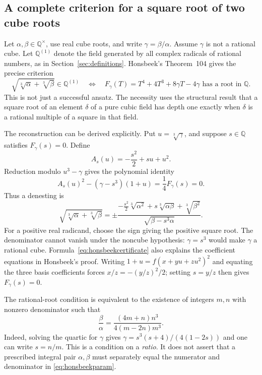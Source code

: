 \documentclass[11pt,a4paper]{article}
\newcommand{\Q}{\mathbb{Q}}
\newcommand{\cbrt}[1]{\sqrt[3]{#1}}
\theoremstyle{definition}
\theoremstyle{remark}
\numberwithin{equation}{section}
\begin{document}
\subsection{A complete criterion for a square root of two cube roots}

Let $\alpha,\beta\in\Q^\times$, use real cube roots, and write $\gamma=\beta/\alpha$. Assume $\gamma$ is not a rational cube. Let $\Q^{(1)}$ denote the field generated by all complex radicals of rational numbers, as in Section~\ref{sec:definitions}. Honsbeek's Theorem~104 gives the precise criterion
\begin{equation}\label{eq:honsbeektest}
 \sqrt{\cbrt\alpha+\cbrt\beta}\in\Q^{(1)}
 \quad\Longleftrightarrow\quad
 F_\gamma(T)=T^4+4T^3+8\gamma T-4\gamma
 \text{ has a root in }\Q.
\end{equation}
This is not just a successful ansatz. The necessity uses the structural result that a square root of an element $\delta$ of a pure cubic field has depth one exactly when $\delta$ is a rational multiple of a square in that field.\cite{honsbeek2005}

The reconstruction can be derived explicitly. Put $u=\cbrt\gamma$, and suppose $s\in\Q$ satisfies $F_\gamma(s)=0$. Define
\[
 A_s(u)=-\frac{s^2}{2}+su+u^2.
\]
Reduction modulo $u^3-\gamma$ gives the polynomial identity
\begin{equation}\label{eq:honsbeekcertificate}
 A_s(u)^2-(\gamma-s^3)(1+u)=\frac14F_\gamma(s)=0.
\end{equation}
Thus a denesting is
\begin{equation}\label{eq:honsbeekreconstruction}
 \sqrt{\cbrt\alpha+\cbrt\beta}
 =\pm\frac{-\frac{s^2}{2}\cbrt{\alpha^2}
                 +s\cbrt{\alpha\beta}+\cbrt{\beta^2}}
                {\sqrt{\beta-s^3\alpha}}.
\end{equation}
For a positive real radicand, choose the sign giving the positive square root. The denominator cannot vanish under the noncube hypothesis: $\gamma=s^3$ would make $\gamma$ a rational cube. Formula~\eqref{eq:honsbeekcertificate} also explains the coefficient equations in Honsbeek's proof. Writing $1+u=f(x+yu+zu^2)^2$ and equating the three basis coefficients forces $x/z=-(y/z)^2/2$; setting $s=y/z$ then gives $F_\gamma(s)=0$.

The rational-root condition is equivalent to the existence of integers $m,n$ with nonzero denominator such that
\begin{equation}\label{eq:honsbeekparam}
 \frac\beta\alpha=\frac{(4m+n)n^3}{4(m-2n)m^3}.
\end{equation}
Indeed, solving the quartic for $\gamma$ gives
$\gamma=s^3(s+4)/(4(1-2s))$ and one can write $s=n/m$. This is a condition on a \emph{ratio}. It does not assert that a prescribed integral pair $\alpha,\beta$ must separately equal the numerator and denominator in \eqref{eq:honsbeekparam}.
\end{document}
